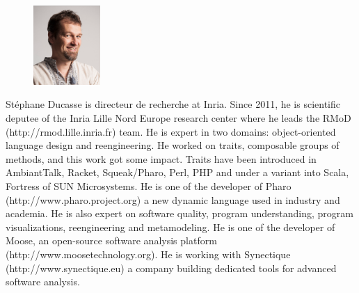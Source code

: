 \documentclass[a4paper,10pt,twoside]{book}
\begin{document}
\begin{figure}
\centering
\includegraphics[width=1in]{stephane}
\end{figure}
St\'ephane Ducasse is directeur de recherche at Inria. Since 2011, he is scientific deputee of the Inria Lille Nord Europe 
research center where he leads the RMoD (http://rmod.lille.inria.fr) team. He is expert in two domains: object-oriented language design and reengineering.  He worked on traits, composable groups of methods, and this work got some impact. Traits have been introduced in AmbiantTalk, Racket, Squeak/Pharo, Perl, PHP and  under a variant into Scala, Fortress of SUN Microsystems. He is one of the developer of Pharo (http://www.pharo.project.org) a new dynamic language used in industry and academia. He is also expert on software quality, program understanding, program visualizations, reengineering and metamodeling. He is one of the developer of Moose, an open-source software analysis platform (http://www.moosetechnology.org).  He is working with Synectique (http://www.synectique.eu) a company building dedicated tools for advanced software analysis.





\ifx\wholebook\relax\else
   
   
\end{document}
